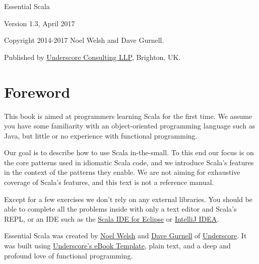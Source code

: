 \documentclass[11pt,a5paper,]{book}
\begin{document}



\vspace*{\fill}

\begin{center}

{\Large Essential Scala}

Version 1.3, April 2017

Copyright 2014-2017 Noel Welsh and Dave Gurnell.


Published by \href{http://underscore.io}{Underscore Consulting LLP}, Brighton, UK.

\end{center}

\vspace{1em}


\vspace*{\fill}


{
\hypersetup{linkcolor=black}
\setcounter{tocdepth}{2}
\tableofcontents
}


\hypertarget{foreword}{%
\chapter*{Foreword}\label{foreword}}

This book is aimed at programmers learning Scala for the first time. We
assume you have some familiarity with an object-oriented programming
language such as Java, but little or no experience with functional
programming.

Our goal is to describe how to use Scala in-the-small. To this end our
focus is on the core patterns used in idiomatic Scala code, and we
introduce Scala's features in the context of the patterns they enable.
We are not aiming for exhaustive coverage of Scala's features, and this
text is not a reference manual.

Except for a few exercises we don't rely on any external libraries. You
should be able to complete all the problems inside with only a text
editor and Scala's REPL, or an IDE such as the
\href{http://scala-ide.org/}{Scala IDE for Eclipse} or
\href{http://www.jetbrains.com/idea/}{IntelliJ IDEA}.

Essential Scala was created by \href{http://noelwelsh.com}{Noel Welsh}
and \href{http://davegurnell.com/}{Dave Gurnell} of
\href{http://underscore.io}{Underscore}. It was built using
\href{https://github.com/underscoreio/underscore-ebook-template}{Underscore's
eBook Template}, plain text, and a deep and profound love of functional
programming.
\end{document}
